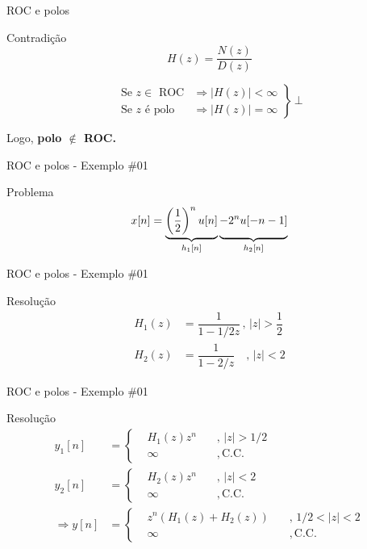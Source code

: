 \begin{frame}{ROC e polos}
\begin{block}{Contradição}
	\[ H(z)=\dfrac{N(z)}{D(z)} \]
	
	\[ \left. \begin{aligned}
	\text{Se } z \in \text{ ROC}&\Rightarrow |H(z)|<\infty\\
	\text{Se } z \text{ é polo} &\Rightarrow |H(z)|=\infty
	\end{aligned}\right\rbrace\, \bot  \]
	
	Logo, \textbf{polo $ \bm{\notin} $ ROC.}
\end{block}
\end{frame}


\begin{frame}{ROC e polos - Exemplo \#01}
	\begin{block}{Problema}
		\[ x[n]=\underbrace{\left( \dfrac{1}{2}\right)^{n}u[n]}_{h_1[n]}\underbrace{-2^{n}u[-n-1]\vphantom{\left(\dfrac{1}{2}\right)}}_{h_2[n]} \]
	\end{block}
\end{frame}


\begin{frame}{ROC e polos - Exemplo \#01}
\begin{block}{Resolução}
	\begin{align*}
		H_1(z)&=\dfrac{1}{1-1/2z}\, , \, |z|>\dfrac{1}{2}\\
		H_2(z)&=\dfrac{1}{1-2/z} \quad , \, |z|<2
	\end{align*}
\end{block}

\vspace{0.5cm}

\centering
\scalebox{0.8}{}

\end{frame}


\begin{frame}{ROC e polos - Exemplo \#01}
\begin{block}{Resolução}
	\centering
	\begin{align*}
	y_1[n]&=\left\lbrace \begin{aligned}
	&H_1(z)z^{n}& \, &, \, |z|>1/2\\
	&\infty& \, &, \, \text{C.C.}
	\end{aligned} \right.\\
	y_2[n]&=\left\lbrace \begin{aligned}
	&H_2(z)z^{n}& \, &, \, |z|<2\\
	&\infty& \, &, \, \text{C.C.}
	\end{aligned} \right.\\
	\Rightarrow y[n]& =\left\lbrace \begin{aligned}
	&z^{n}\left(H_1(z)+H_2(z) \right)& \, &, \, 1/2<|z|<2\\
	&\infty& \, &, \, \text{C.C.}
	\end{aligned} \right.
	\end{align*}
\end{block}
\end{frame}


